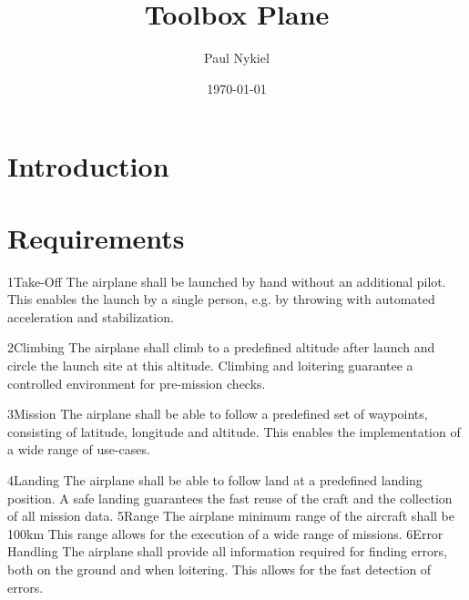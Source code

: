 \documentclass{scrartcl}
\title{Toolbox Plane}
\author{Paul Nykiel}
\date{\today}
\begin{document}
\maketitle
\tableofcontents
\section{Introduction}


\section{Requirements}

\dd
    {1}{Take-Off}
    {
        The airplane shall be launched by hand without an additional pilot. 
    }
    {
        This enables the launch by a single person, e.g. by throwing
        with automated acceleration and stabilization.
    }

\dd
    {2}{Climbing}
    {
        The airplane shall climb to a predefined altitude after launch and
        circle the launch site at this altitude. 
    }
    {
        Climbing and loitering guarantee a controlled environment
        for pre-mission checks.
    }

\dd
    {3}{Mission}
    {
        The airplane shall be able to follow a predefined set of waypoints, consisting
        of latitude, longitude and altitude. 
    }
    {
        This enables the implementation of a wide range of use-cases.
    }

\dd
    {4}{Landing}
    {
        The airplane shall be able to follow land at a predefined landing position.    
    }
    {
        A safe landing guarantees the fast reuse of the craft and the collection
        of all mission data.
    }
\dd
    {5}{Range}
    {
        The airplane minimum range of the aircraft shall be 100km
    }
    {
        This range allows for the execution of a wide range of missions.
    }
\dd
    {6}{Error Handling}
    {
        The airplane shall provide all information required for finding
        errors, both on the ground and when loitering.
    }
    {
        This allows for the fast detection of errors.
    }
\end{document}
